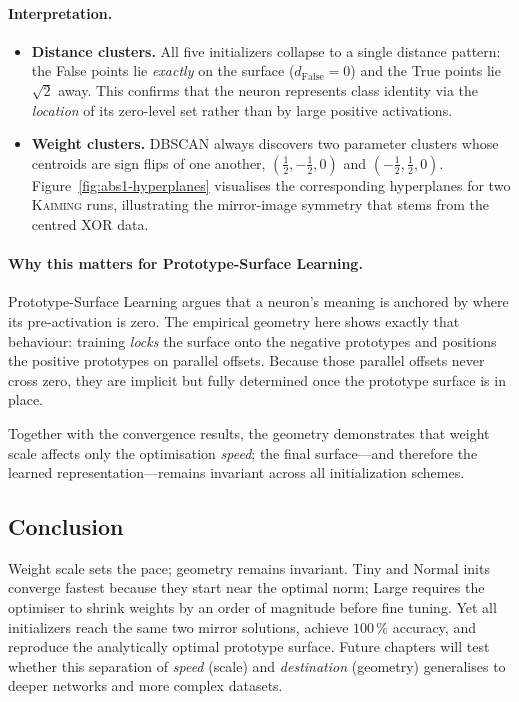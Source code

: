 \paragraph{Interpretation.}
\begin{itemize}
  \item \textbf{Distance clusters.}  
        All five initializers collapse to a single distance pattern:
        the False points lie \emph{exactly} on the surface
        ($d_{\text{False}}=0$) and the True points lie \(\sqrt2\) away.
        This confirms that the neuron represents class identity via the
        \emph{location} of its zero-level set rather than by large positive
        activations.
  \item \textbf{Weight clusters.}  
        DBSCAN always discovers two parameter clusters whose centroids are
        sign flips of one another,
        \((\frac12,-\frac12,0)\) and \((-\frac12,\frac12,0)\).
        Figure~\ref{fig:abs1-hyperplanes} visualises the corresponding
        hyperplanes for two \textsc{Kaiming} runs, illustrating the
        mirror-image symmetry that stems from the centred XOR data.
\end{itemize}

\paragraph{Why this matters for Prototype-Surface Learning.}
Prototype-Surface Learning argues that a neuron’s meaning is anchored by
where its pre-activation is zero.  The empirical geometry here shows exactly
that behaviour: training \emph{locks} the surface onto the negative prototypes
and positions the positive prototypes on parallel offsets.  Because those
parallel offsets never cross zero, they are implicit but fully determined once
the prototype surface is in place.

Together with the convergence results, the geometry demonstrates that weight
scale affects only the optimisation \emph{speed}; the final surface—and
therefore the learned representation—remains invariant across all
initialization schemes.

\subsection*{Conclusion}

Weight scale sets the pace; geometry remains invariant.  Tiny and Normal
inits converge fastest because they start near the optimal norm; Large
requires the optimiser to shrink weights by an order of magnitude before fine
tuning.  Yet all initializers reach the same two mirror solutions, achieve
$100\,\%$ accuracy, and reproduce the analytically optimal prototype surface.
Future chapters will test whether this separation of \emph{speed} (scale) and
\emph{destination} (geometry) generalises to deeper networks and more complex
datasets.


